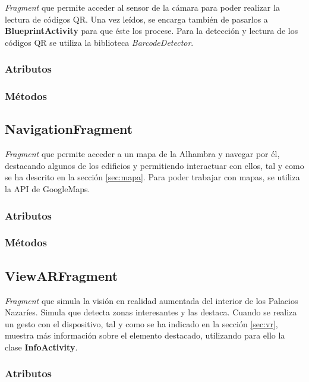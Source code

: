 \documentclass[11pt,a4paper]{article}
\begin{document}
\textit{Fragment} que permite acceder al sensor de la cámara para poder realizar la lectura
de códigos QR. Una vez leídos, se encarga también de pasarlos a \textbf{BlueprintActivity} para que éste los procese.
Para la detección y lectura de los códigos QR se utiliza la biblioteca \textit{BarcodeDetector}.

\subsubsection{Atributos}

\subsubsection{Métodos}

\subsection{\textbf{NavigationFragment}}
\label{sec:nav}

\textit{Fragment} que permite acceder a un mapa de la Alhambra y navegar por él, destacando
algunos de los edificios y permitiendo interactuar con ellos, tal y como se ha descrito en la sección \ref{sec:mapa}.
Para poder trabajar con mapas, se utiliza la API de GoogleMaps.

\subsubsection{Atributos}

\subsubsection{Métodos}

\subsection{\textbf{ViewARFragment}}
\label{sec:view}

\textit{Fragment} que simula la visión en realidad aumentada del interior de los Palacios
Nazaríes. Simula que detecta zonas interesantes y las destaca. Cuando se realiza un gesto con el dispositivo, tal y como se
ha indicado en la sección \ref{sec:vr}, muestra más información sobre el elemento destacado, utilizando para ello la clase
\textbf{InfoActivity}.

\subsubsection{Atributos}
\end{document}
